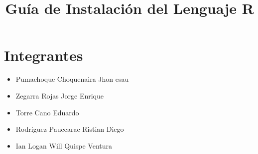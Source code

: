 \documentclass[letterpaper,12pt]{article}
\title{\textbf{Guía de Instalación del Lenguaje R}}
\author{}
\date{}
\newcommand{\Integrantea}{Pumachoque Choquenaira Jhon esau}
\newcommand{\Integranteb}{Zegarra Rojas Jorge Enrique}
\newcommand{\Integrantec}{Torre Cano Eduardo}
\newcommand{\Integranted}{Rodriguez Pauccarac Ristian Diego}
\newcommand{\Integrantee}{Ian Logan Will Quispe Ventura}
\begin{document}
\maketitle

\section*{Integrantes}
\begin{itemize}[noitemsep]
    \item \Integrantea
    \item \Integranteb
    \item \Integrantec
    \item \Integranted
    \item \Integrantee
\end{itemize}
\end{document}
